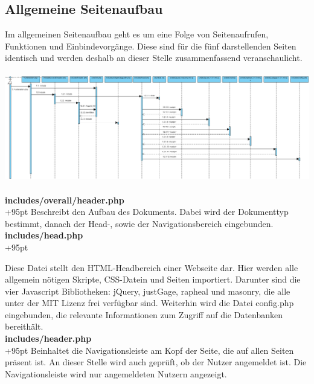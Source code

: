 \documentclass[fontsize = 12pt, paper = a4]{scrreprt}
\begin{document}
\newpage



\subsection{Allgemeine Seitenaufbau}
Im allgemeinen Seitenaufbau geht es um eine Folge von Seitenaufrufen, Funktionen und Einbindevorgänge. Diese sind für die fünf darstellenden Seiten identisch und werden deshalb an dieser Stelle zusammenfassend veranschaulicht.
\\ \\
\includegraphics[scale=0.327]{allgemeineSeitenaufbau.png}
\\ \\

\textbf{includes/overall/header.php}\\
\hangindent+95pt 
Beschreibt den Aufbau des Dokuments. Dabei wird der Dokumenttyp bestimmt, danach der Head-, sowie der Navigationsbereich eingebunden.\\


\textbf{includes/head.php}\\
\hangindent+95pt 

Diese Datei stellt den HTML-Headbereich einer Webseite dar. Hier werden alle allgemein nötigen Skripte, CSS-Datein und Seiten importiert. Darunter sind die vier Javascript Bibliotheken: jQuery, justGage, rapheal und masonry, die alle unter der MIT Lizenz frei verfügbar sind. Weiterhin wird die Datei config.php eingebunden, die relevante Informationen zum Zugriff auf die Datenbanken bereithält.\\


\textbf{includes/header.php}\\
\hangindent+95pt 
Beinhaltet die Navigationsleiste am Kopf der Seite, die auf allen Seiten präsent ist. An dieser Stelle wird auch geprüft, ob der Nutzer angemeldet ist. Die Navigationsleiste wird nur angemeldeten Nutzern angezeigt.
\end{document}
